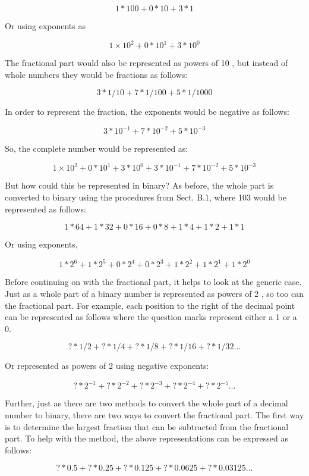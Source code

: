 \documentclass[10pt]{book}
\begin{document}
\begin{center}
\begin{center}
\begin{center}
\begin{center}
\begin{center}
$$
1 * 100+0 * 10+3 * 1
$$

Or using exponents as

$$
1 \times 10^{2}+0 * 10^{1}+3 * 10^{0}
$$

The fractional part would also be represented as powers of 10 , but instead of whole numbers they would be fractions as follows:

$$
3 * 1 / 10+7 * 1 / 100+5 * 1 / 1000
$$

In order to represent the fraction, the exponents would be negative as follows:

$$
3 * 10^{-1}+7 * 10^{-2}+5 * 10^{-3}
$$

So, the complete number would be represented as:

$$
1 \times 10^{2}+0 * 10^{1}+3 * 10^{0}+3 * 10^{-1}+7 * 10^{-2}+5 * 10^{-3}
$$

But how could this be represented in binary? As before, the whole part is converted to binary using the procedures from Sect. B.1, where 103 would be represented as follows:

$$
1 * 64+1 * 32+0 * 16+0 * 8+1 * 4+1 * 2+1 * 1
$$

Or using exponents,

$$
1 * 2^{6}+1 * 2^{5}+0 * 2^{4}+0 * 2^{3}+1 * 2^{2}+1 * 2^{1}+1 * 2^{0}
$$

Before continuing on with the fractional part, it helps to look at the generic case. Just as a whole part of a binary number is represented as powers of 2 , so too can the fractional part. For example, each position to the right of the decimal point can be represented as follows where the question marks represent either a 1 or a 0.

$$
? * 1 / 2+? * 1 / 4+? * 1 / 8+? * 1 / 16+? * 1 / 32 \ldots
$$

Or represented as powers of 2 using negative exponents:

$$
? * 2^{-1}+? * 2^{-2}+? * 2^{-3}+? * 2^{-4}+? * 2^{-5} \ldots
$$

Further, just as there are two methods to convert the whole part of a decimal number to binary, there are two ways to convert the fractional part. The first way is to determine the largest fraction that can be subtracted from the fractional part. To help with the method, the above representations can be expressed as follows:

$$
? * 0.5+? * 0.25+? * 0.125+? * 0.0625+? * 0.03125 \ldots
$$


\end{center}
\end{center}
\end{center}
\end{center}
\end{center}
\end{document}
